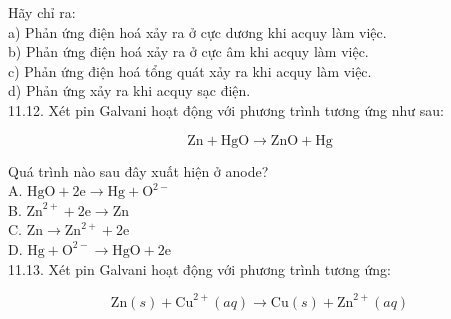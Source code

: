 \documentclass[10pt]{article}
\begin{document}
Hãy chỉ ra:\\
a) Phản ứng điện hoá xảy ra ở cực dương khi acquy làm việc.\\
b) Phản ứng điện hoá xảy ra ở cực âm khi acquy làm việc.\\
c) Phản ứng điện hoá tổng quát xảy ra khi acquy làm việc.\\
d) Phản ứng xảy ra khi acquy sạc điện.\\
11.12. Xét pin Galvani hoạt động với phương trình tương ứng như sau:

$$
\mathrm{Zn}+\mathrm{HgO} \rightarrow \mathrm{ZnO}+\mathrm{Hg}
$$

Quá trình nào sau đây xuất hiện ở anode?\\
A. $\mathrm{HgO}+2 \mathrm{e} \rightarrow \mathrm{Hg}+\mathrm{O}^{2-}$\\
B. $\mathrm{Zn}^{2+}+2 \mathrm{e} \rightarrow \mathrm{Zn}$\\
C. $\mathrm{Zn} \rightarrow \mathrm{Zn}^{2+}+2 \mathrm{e}$\\
D. $\mathrm{Hg}+\mathrm{O}^{2-} \rightarrow \mathrm{HgO}+2 \mathrm{e}$\\
11.13. Xét pin Galvani hoạt động với phương trình tương ứng:

$$
\mathrm{Zn}(s)+\mathrm{Cu}^{2+}(a q) \rightarrow \mathrm{Cu}(s)+\mathrm{Zn}^{2+}(a q)
$$
\end{document}
